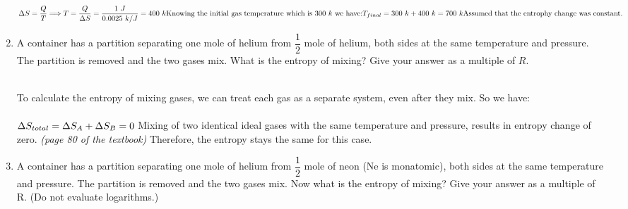 \documentclass[fleqn]{article}
\begin{document}
\begin{enumerate}
      \textcolor{hwColor}{
        \\
        $
          \Delta S=\dfrac{Q}{T} \Longrightarrow T=\dfrac{Q}{\Delta S}=\dfrac{1 ~ J}{0.0025 ~ k/J}=400 ~ k
          \\
          \\
          \text{Knowing the initial gas temperature which is } 300 ~ k \text{ we have:}
          \\
          \\
          T_{final}=300 ~ k+400 ~ k=700 ~ k
          \\
          \\
          \text{Assumed that the entrophy change was constant.}
          \\
        $
      }

    \item A container has a partition separating one mole of helium from $\dfrac{1}{2}$ mole of helium, both sides at
    the same temperature and pressure. The partition is removed and the two gases mix. What is the entropy of 
    mixing? Give your answer as a multiple of $R$.

      \textcolor{hwColor}{
        \\
        To calculate the entropy of mixing gases, we can treat each gas as a separate system, even after they mix. So
        we have:
        \\
        \\
        $
          \Delta S_{total}=\Delta S_A+\Delta S_B=0
          \\
          \\
        $
        Mixing of two identical ideal gases with the same temperature and pressure, results in entropy change of zero.
        \emph{(page 80 of the textbook)} Therefore, the entropy stays the same for this case.
        \\
      }

    \item A container has a partition separating one mole of helium from $\dfrac{1}{2}$ mole of neon 
    (Ne is monatomic), both sides at the same temperature and pressure. The partition is removed and 
    the two gases mix. Now what is the entropy of mixing? Give your answer as a multiple of R. (Do not evaluate
    logarithms.)


\end{enumerate}
\end{document}
